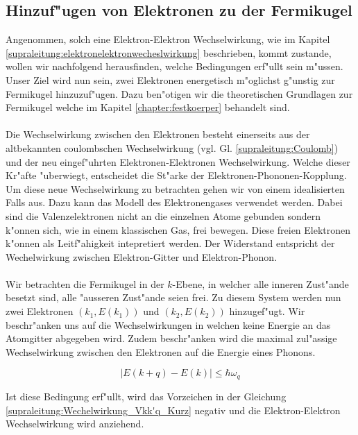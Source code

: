 \begin{refsection}
\section{Hinzuf"ugen von Elektronen zu der Fermikugel}
Angenommen, solch eine Elektron-Elektron Wechselwirkung, wie im Kapitel \ref{supraleitung:elektronelektronwecheslwirkung} beschrieben, kommt zustande, wollen wir nachfolgend herausfinden, welche Bedingungen erf"ullt sein m"ussen.
\\
Unser Ziel wird nun sein, zwei Elektronen energetisch m"oglichst g"unstig zur Fermikugel hinzuzuf"ugen. Dazu ben"otigen wir die theoretischen Grundlagen zur Fermikugel welche im Kapitel \ref{chapter:festkoerper} behandelt sind.
\\
\\
Die Wechselwirkung zwischen den Elektronen besteht einerseits aus der altbekannten coulombschen Wechselwirkung (vgl. Gl. \ref{supraleitung:Coulomb}) und der neu eingef"uhrten Elektronen-Elektronen Wechselwirkung. Welche dieser Kr"afte "uberwiegt, entscheidet die St"arke der Elektronen-Phononen-Kopplung.
\\
Um diese neue Wechselwirkung zu betrachten gehen wir von einem idealisierten Falls aus. Dazu kann das Modell des Elektronengases verwendet werden. Dabei sind die Valenzelektronen nicht an die einzelnen Atome gebunden sondern k"onnen sich, wie in einem klassischen Gas, frei bewegen. Diese freien Elektronen k"onnen als Leitf"ahigkeit intepretiert werden. Der Widerstand entspricht der Wechelwirkung zwischen Elektron-Gitter und Elektron-Phonon.
\\
\\
Wir betrachten die Fermikugel in der $k$-Ebene, in welcher alle inneren Zust"ande besetzt sind, alle "ausseren Zust"ande seien frei. Zu diesem System werden nun zwei Elektronen $(k_1,E(k_1))$ und $(k_2,E(k_2))$ hinzugef"ugt. Wir beschr"anken uns auf die Wechselwirkungen in welchen keine Energie an das Atomgitter abgegeben wird. Zudem beschr"anken wird die maximal zul"assige Wechselwirkung zwischen den Elektronen auf die Energie eines Phonons.

\begin{equation}
|E(k+q)-E(k)|\le\hbar\omega_q
\label{supraleitung:Phonon Energie}
\end{equation}

Ist diese Bedingung erf"ullt, wird das Vorzeichen in der Gleichung \ref{supraleitung:Wechelwirkung_Vkk'q_Kurz} negativ und die Elektron-Elektron Wechselwirkung wird anziehend.


\end{refsection}
